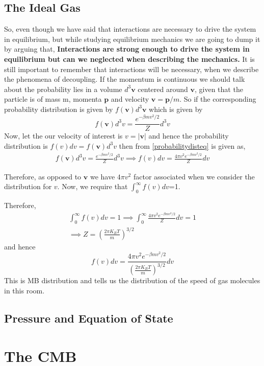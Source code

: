 \documentclass[12pt]{report}
\newcommand{\mbf}[1]{\mathbf{#1}}
\newcommand{\tbf}[1]{\textbf{#1}}
\newcommand{\dint}[3]{$\int^{#1}_{#2}{#3}$}
\begin{document}
\subsection{The Ideal Gas}
So, even though we have said that interactions are necessary to drive the system in equilibrium, but while studying equilibrium mechanics we are going to dump it by arguing that, \tbf{Interactions are strong enough to drive the system in equilibrium but can we neglected when describing the mechanics.} It is still important to remember that interactions will be necessary, when we describe the phenomena of decoupling.
 If the momentum is continuous we should talk about the probability lies in a volume $d^3\mbf{v}$ centered around $\mbf{v}$, given that the particle is of mass m, momenta $\mbf{p}$ and velocity $\mbf{v}=\mbf{p}/m$. So if the corresponding probability distribution is given by $f(\mbf{v})d^3\mbf{v}$ which is given by
\begin{equation}\label{probabilitydisteq}
f(\mbf{v})d^3v=\frac{e^{-\beta m v^2/2}}{Z}d^3v
\end{equation}
Now, let the our velocity of interest is $v=|\mbf{v}|$ and hence the probability distribution is $f(v)dv=f(\mbf{v})d^3v$ then from \eqref{probabilitydisteq} is given as,
\begin{eqnarray}
f(\mbf{v})d^3v=\frac{e^{-\beta m v^2/2}}{Z}d^3v
\implies f(v)dv=\frac{4 \pi v^2 e^{-\beta m v^2/2}}{Z}dv
\end{eqnarray}

Therefore, as opposed to $\mbf{v}$ we have $4 \pi v^2$ factor associated when we consider the distribution for $v$. Now, we require that \dint{\infty}{0}{f(v)dv}=1.

Therefore, 
\begin{eqnarray}
\int^\infty_0 f(v) dv =1 \implies \int^\infty_0 \frac{4 \pi v^2 e^{-\beta m v^2/2}}{Z}dv =1  \\
\implies Z=\left(\frac{2 \pi K_B T}{m}\right)^{3/2}
\end{eqnarray} 
and hence 
\begin{equation}
f(v)dv=\frac{4 \pi v^2 e^{-\beta m v^2/2}}{\left(\frac{2 \pi K_B T}{m}\right)^{3/2}}dv
\end{equation}
This is MB distribution and tells us the distribution of the speed of gas molecules in this room.
\subsection*{Pressure and Equation of State}
\section{The CMB}
\end{document}
